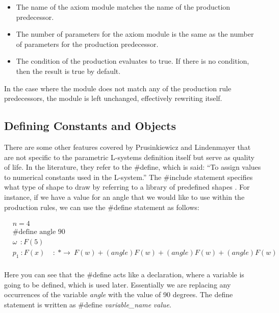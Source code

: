 \begin{itemize}
\item The name of the axiom module matches the name of the production predecessor.
\item The number of parameters for the axiom module is the same as the number of parameters for the production predecessor.
\item The condition of the production evaluates to true. If there is no condition, then the result is true by default.
\end{itemize}

\noindent
In the case where the module does not match any of the production rule predecessors, the module is left unchanged, effectively rewriting itself. 

\subsection{Defining Constants and Objects}

There are some other features covered by Prusinkiewicz and Lindenmayer that are not specific to the parametric L-systems definition itself but serve as quality of life. In the literature, they refer to the \#define, which is said: ``To assign values to numerical constants used in the L-system.'' The \#include statement specifies what type of shape to draw by referring to a library of predefined shapes \cite{prusinkiewicz2012algorithmic}.
\noindent
For instance, if we have a value for an angle that we would like to use within the production rules, we can use the \#define statement as follows:

\begin{equation} \label{define statement example}
\begin{aligned}
	&n=4 \\
	&\textrm{\#define angle 90}\\
	&\omega~~ : F(5)\\
	&p_1~ :  F(x)~~~~~ :~ * \rightarrow~ F(w)+(angle)F(w)+(angle)F(w)+(angle)F(w)\\
\end{aligned}
\end{equation}

Here you can see that the \#define acts like a declaration, where a variable is going to be defined, which is used later. Essentially we are replacing any occurrences of the variable \textit{angle} with the value of 90 degrees. The define statement is written as  \#define \textit{variable\_name} \textit{value}.


